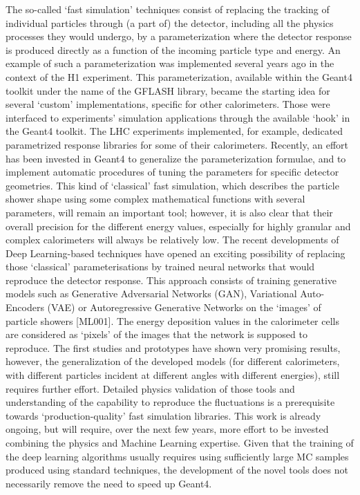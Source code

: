 \documentclass[10pt,a4paper]{article}
\begin{document}
The so-called `fast simulation' techniques consist of replacing the
tracking of individual particles through (a part of) the detector,
including all the physics processes they would undergo, by a
parameterization where the detector response is produced directly as a
function of the incoming particle type and energy. An example of such a
parameterization was implemented several years ago in the context of the
H1 experiment. This parameterization, available within the Geant4
toolkit under the name of the GFLASH library, became the starting idea
for several `custom' implementations, specific for other calorimeters.
Those were interfaced to experiments' simulation applications through
the available `hook' in the Geant4 toolkit. The LHC experiments
implemented, for example, dedicated parametrized response libraries for
some of their calorimeters. Recently, an effort has been invested in
Geant4 to generalize the parameterization formulae, and to implement
automatic procedures of tuning the parameters for specific detector
geometries. This kind of `classical' fast simulation, which describes
the particle shower shape using some complex mathematical functions with
several parameters, will remain an important tool; however, it is also
clear that their overall precision for the different energy values,
especially for highly granular and complex calorimeters will always be
relatively low. The recent developments of Deep Learning-based
techniques have opened an exciting possibility of replacing those
`classical' parameterisations by trained neural networks that would
reproduce the detector response. This approach consists of training
generative models such as Generative Adversarial Networks (GAN),
Variational Auto-Encoders (VAE) or Autoregressive Generative Networks on
the `images' of particle showers {[}ML001{]}. The energy deposition
values in the calorimeter cells are considered as `pixels' of the images
that the network is supposed to reproduce. The first studies and
prototypes have shown very promising results, however, the
generalization of the developed models (for different calorimeters, with
different particles incident at different angles with different
energies), still requires further effort. Detailed physics validation of
those tools and understanding of the capability to reproduce the
fluctuations is a prerequisite towards `production-quality' fast
simulation libraries. This work is already ongoing, but will require,
over the next few years, more effort to be invested combining the
physics and Machine Learning expertise. Given that the training of the
deep learning algorithms usually requires using sufficiently large MC
samples produced using standard techniques, the development of the novel
tools does not necessarily remove the need to speed up Geant4.
\end{document}
